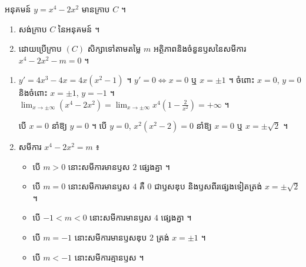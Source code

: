 \begin{example}[ឧទាហរណ៍]
អនុគមន៍ $y = x^4 - 2x^2$ មានក្រាប $C$ ។
\begin{enumerate}[a]
  \item សង់ក្រាប $C$ នៃអនុគមន៍ ។
  \item ដោយប្រើក្រាប $(C)$ សិក្សាទៅតាមតម្លៃ $m$ អត្ថិភាពនិងចំនួនឫសនៃសមីការ $x^4 - 2x^2 - m = 0$ ។
\end{enumerate}
\end{example}
\ans
\begin{enumerate}[a]
  \item $y' = 4x^3 - 4x = 4x(x^2 - 1)$ ។ $y' = 0 \Leftrightarrow x = 0$ ឬ $x = \pm 1$ ។ ចំពោះ $x = 0$, $y = 0$ និងចំពោះ $x = \pm 1$, $y = -1$ ។ $\displaystyle\lim_{x \to \pm\infty}(x^4 - 2x^2) = \lim_{x \to \pm\infty} x^4\left(1 - \frac{2}{x^2}\right) = +\infty$ ។
  \begin{center}
  \end{center}
  បើ $x = 0$ នាំឱ្យ $y = 0$ ។ បើ $y = 0$, $x^2(x^2 - 2) = 0$ នាំឱ្យ $x = 0$ ឬ $x = \pm\sqrt{2}$ ។
  \item សមីការ $x^4 - 2x^2 = m$ ៖
  \begin{itemize}
    \item បើ $m > 0$ នោះសមីការមានឫស $2$ ផ្សេងគ្នា ។
    \item បើ $m = 0$ នោះសមីការមានឫស $4$ គឺ $0$ ជាឫសឌុប និងឫសពីរផ្សេងទៀតត្រង់ $x = \pm\sqrt{2}$ ។
    \item បើ $-1 < m < 0$ នោះសមីការមានឫស $4$ ផ្សេងគ្នា ។
    \item បើ $m = -1$ នោះសមីការមានឫសឌុប $2$ ត្រង់ $x = \pm 1$ ។
    \item បើ $m < -1$ នោះសមីការគ្មានឫស ។
  \end{itemize}
\end{enumerate}

\begin{center}
\end{center}


